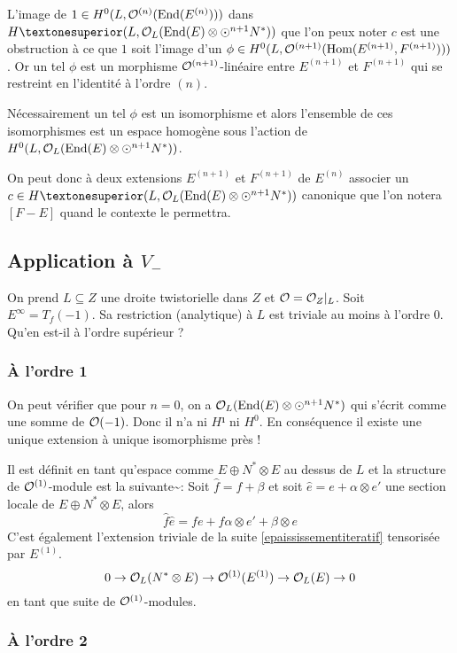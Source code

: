 \documentclass[a4paper]{amsart}
\begin{document}
L'image de $1 \in H^0(L,\mathcal{O}^{(n)}(\text{End}(E^{(n)})))$ dans $H¹(L,\Oo_L(\End(E) \otimes \odot^{n+1}N^*))$ que l'on peux noter $c$ est une obstruction à ce que $1$ soit l'image d'un $\phi \in H^0(L,\mathcal{O}^{(n+1)}(\text{Hom}(E^{(n+1)},F^{(n+1)})))$. Or un tel $\phi$ est un morphisme $\mathcal{O}^{(n+1)}$-linéaire entre $E^{(n+1)}$ et $F^{(n+1)}$ qui se restreint en l'identité à l'ordre $(n)$.

Nécessairement un tel $\phi$ est un isomorphisme et alors l'ensemble de ces isomorphismes est un espace homogène sous l'action de $H^0(L,\mathcal{O}_L(\text{End}(E) \otimes \odot^{n+1}N^*))$.

On peut donc à deux extensions $E^{(n+1)}$ et $F^{(n+1)}$ de $E^{(n)}$ associer un $c \in H¹(L,\Oo_L(\End(E) \otimes \odot^{n+1}N^*))$ canonique que l'on notera $[F-E]$ quand le contexte le permettra.
\subsection{Application à $V_-$}
\label{sec-3-3}

On prend $L \subseteq Z$ une droite twistorielle dans $Z$ et $\mathcal{O} = \mathcal{O}_Z \vert_L$.
Soit $E^\infty = T_f(-1)$. Sa restriction (analytique) à $L$ est triviale au moins à l'ordre $0$. Qu'en est-il à l'ordre supérieur ?
\subsubsection{À l'ordre 1}
\label{sec-3-3-1}

On peut vérifier que pour $n=0$, on a $\mathcal{O}_L(\text{End}(E) \otimes \odot^{n+1}N^*)$ qui s'écrit comme une somme de $\mathcal{O}(-1)$. Donc il n'a ni $H¹$ ni $H^0$. En conséquence il existe une unique extension à unique isomorphisme près !

 Il est définit en tant qu'espace comme $E \oplus N^* \otimes E$ au dessus de $L$ et la structure de $\mathcal{O}^{(1)}$-module est la suivante\~{}:
Soit $\hat{f} = f + \beta$ et soit $\hat{e} = e + \alpha \otimes e'$ une section locale de $E \oplus N^* \otimes E$, alors
\[
\hat{f}\hat{e} = fe + f\alpha \otimes e' + \beta \otimes e
\]
C'est également l'extension triviale de la suite \eqref{epaississementiteratif} tensorisée par $E^{(1)}$.
\[
0 \to \mathcal{O}_L(N^* \otimes E) \to \mathcal{O}^{(1)}(E^{(1)}) \to \mathcal{O}_L(E) \to 0
\]
en tant que suite de $\mathcal{O}^{(1)}$-modules.
\subsubsection{À l'ordre 2}
\label{sec-3-3-2}
\end{document}
